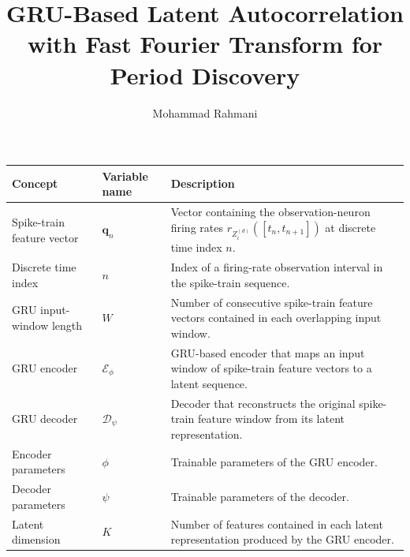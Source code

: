 \documentclass[a4paper]{article}
\title{GRU-Based Latent Autocorrelation with Fast Fourier Transform for Period Discovery}
\date{}
\author{Mohammad Rahmani}
\begin{document}
   \maketitle

   \begin{table}[H]

      \centering

      \small

      \setlength{\tabcolsep}{4pt}

      \begin{tabular}{p{} p{} p{}}

         \hline

         \textbf{Concept} & \textbf{Variable name} & \textbf{Description} \\

         \hline

         Spike-train feature vector
         & $\mathbf{q}_n$
         & Vector containing the observation-neuron firing rates
         $r_{Z_i^{(d)}}([t_n,t_{n+1}])$ at discrete time index $n$. \\

         Discrete time index
         & $n$
         & Index of a firing-rate observation interval in the spike-train sequence. \\

         GRU input-window length
         & $W$
         & Number of consecutive spike-train feature vectors contained in each overlapping input window. \\

         GRU encoder
         & $\mathcal{E}_{\phi}$
         & GRU-based encoder that maps an input window of spike-train feature vectors to a latent sequence. \\

         GRU decoder
         & $\mathcal{D}_{\psi}$
         & Decoder that reconstructs the original spike-train feature window from its latent representation. \\

         Encoder parameters
         & $\phi$
         & Trainable parameters of the GRU encoder. \\

         Decoder parameters
         & $\psi$
         & Trainable parameters of the decoder. \\

         Latent dimension
         & $K$
         & Number of features contained in each latent representation produced by the GRU encoder. \\


\end{tabular}
\end{table}
\end{document}

